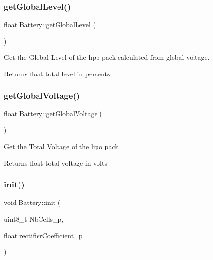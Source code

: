 \subsubsection{\texorpdfstring{get\+Global\+Level()}{getGlobalLevel()}}
{\footnotesize\ttfamily float Battery\+::get\+Global\+Level (\begin{DoxyParamCaption}{ }\end{DoxyParamCaption})}



Get the Global Level of the lipo pack calculated from global voltage. 

\begin{DoxyReturn}{Returns}
float total level in percents 
\end{DoxyReturn}
\mbox{\label{class_battery_a288d5d3b5ebbe964751a9d64519aacdb}} 
\subsubsection{\texorpdfstring{get\+Global\+Voltage()}{getGlobalVoltage()}}
{\footnotesize\ttfamily float Battery\+::get\+Global\+Voltage (\begin{DoxyParamCaption}{ }\end{DoxyParamCaption})}



Get the Total Voltage of the lipo pack. 

\begin{DoxyReturn}{Returns}
float total voltage in volts 
\end{DoxyReturn}
\mbox{\label{class_battery_aed541975df2c26475cbc0c37a9ddf659}} 
\subsubsection{\texorpdfstring{init()}{init()}}
{\footnotesize\ttfamily void Battery\+::init (\begin{DoxyParamCaption}\item[{uint8\+\_\+t}]{Nb\+Cells\+\_\+p,  }\item[{float}]{rectifier\+Coefficient\+\_\+p = {} }\end{DoxyParamCaption})}



